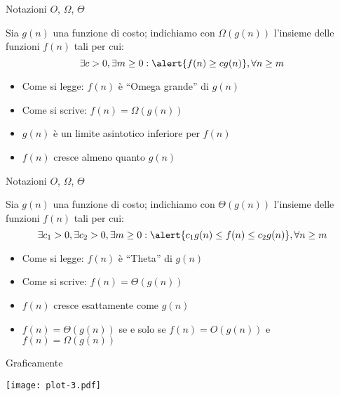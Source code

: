 \begin{frame}{Notazioni $O$, $\Omega$, $\Theta$}

\vspace{-9pt}
\begin{myboxtitle}
Sia $g(n)$ una funzione di costo; indichiamo con $\Omega(g(n))$ l'insieme
delle funzioni $f(n)$ tali per cui:\\[-6pt]
\[
  \exists c>0, \exists m \geq 0: \alert{f(n) \geq cg(n)}, \forall n \geq m
\]
\end{myboxtitle}

\medskip
\begin{itemize}
\item Come si legge: $f(n)$ è “\alert{Omega grande}”  di $g(n)$
\item Come si scrive: $f(n) = \Omega(g(n))$
\item $g(n)$ è un \alert{limite asintotico inferiore} per $f(n)$
\item $f(n)$ cresce almeno quanto $g(n)$
\end{itemize}
\end{frame}

\begin{frame}{Notazioni $O$, $\Omega$, $\Theta$}

\vspace{-9pt}
\begin{myboxtitle}
Sia $g(n)$ una funzione di costo; indichiamo con $\Theta(g(n))$ l'insieme
delle funzioni $f(n)$ tali per cui:\\[-6pt]
\[
  \exists c_1>0, \exists c_2>0, \exists m \geq 0: \alert{c_1g(n) \leq f(n) \leq c_2g(n)}, \forall n \geq m
\]
\end{myboxtitle}

\medskip
\begin{itemize}
\item Come si legge: $f(n)$ è “\alert{Theta}” di $g(n)$
\item Come si scrive: $f(n) = \Theta(g(n))$
\item $f(n)$ cresce esattamente come $g(n)$
\item $f(n) = \Theta(g(n))$ se e solo se $f(n) = O(g(n))$ e $f(n) = \Omega(g(n))$
\end{itemize}

\end{frame}

\begin{frame}{Graficamente}
  
\begin{center}
\vspace{-12pt}
\texttt{[image: plot-3.pdf]}
\end{center}
  
\end{frame}


